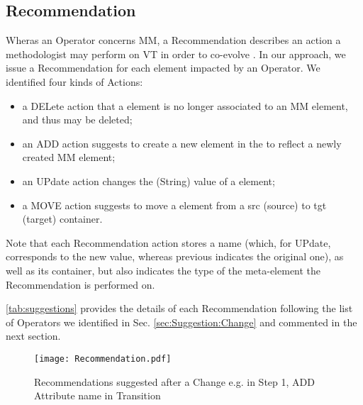 \subsection{Recommendation}
\label{sec:Suggestion:Recommendation}

Wheras an \textsf{Operator} concerns \textsf{MM}, a \textsf{Recommendation} 
describes an action a methodologist may perform on \textsf{VT} in order to
co-evolve \viewtypes. 
In our approach, we issue a \textsf{Recommendation} for each \viewtype element 
impacted by an \textsf{Operator}. We identified four kinds of \textsf{Action}s: 
\begin{itemize}
	\item a \textsf{DEL}ete action that a \viewtype element is no longer associated
	to an \textsf{MM} element, and thus may be deleted;
	\item an \textsf{ADD} action suggests to create a new element in the \viewtype
	to reflect a newly created \textsf{MM} element;
	\item an \textsf{UP}date action changes the (String) value of a \viewtype element;
	\item a \textsf{MOVE} action suggests to move a \viewtype element from a \textsf{src}
	(source) to \textsf{tgt} (target) container.
\end{itemize}
Note that each \textsf{Recommendation} action stores a \textsf{name} (which, for
\textsf{UP}date, corresponds to the new value, whereas \textsf{previous} 
indicates the original one), as well as its \textsf{container}, but also 
indicates the \textsf{type} of the \viewtype meta-element the 
\textsf{Recommendation} is performed on.

\autoref{tab:suggestions} provides the details of each \textsf{Recommendation} 
following the list of \textsf{Operator}s we identified in Sec. 
\ref{sec:Suggestion:Change} and commented in the next section.

\begin{figure}[t]
    \centering
    \texttt{[image: Recommendation.pdf]}
    \caption{\textsf{Recommendation}s suggested after a \textsf{Change}
    e.g. in Step 1, \textsf{ADD} Attribute \textsf{name} in \textsf{Transition}}
    \label{fig:Recommendation}
\end{figure}